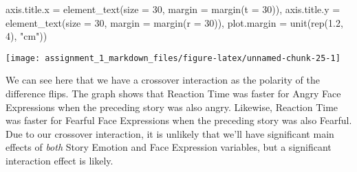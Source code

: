 \documentclass[
]{article}
\newenvironment{Shaded}{\begin{snugshade}}{\end{snugshade}}
\newcommand{\AttributeTok}[1]{\textcolor[rgb]{0.77,0.63,0.00}{#1}}
\newcommand{\DecValTok}[1]{\textcolor[rgb]{0.00,0.00,0.81}{#1}}
\newcommand{\FloatTok}[1]{\textcolor[rgb]{0.00,0.00,0.81}{#1}}
\newcommand{\FunctionTok}[1]{\textcolor[rgb]{0.00,0.00,0.00}{#1}}
\newcommand{\NormalTok}[1]{#1}
\newcommand{\StringTok}[1]{\textcolor[rgb]{0.31,0.60,0.02}{#1}}
\begin{document}
\begin{Shaded}
\begin{Highlighting}[]
        \AttributeTok{axis.title.x =} \FunctionTok{element\_text}\NormalTok{(}\AttributeTok{size =} \DecValTok{30}\NormalTok{, }\AttributeTok{margin =} \FunctionTok{margin}\NormalTok{(}\AttributeTok{t =} \DecValTok{30}\NormalTok{)),}
        \AttributeTok{axis.title.y =} \FunctionTok{element\_text}\NormalTok{(}\AttributeTok{size =} \DecValTok{30}\NormalTok{, }\AttributeTok{margin =} \FunctionTok{margin}\NormalTok{(}\AttributeTok{r =} \DecValTok{30}\NormalTok{)),}
        \AttributeTok{plot.margin =} \FunctionTok{unit}\NormalTok{(}\FunctionTok{rep}\NormalTok{(}\FloatTok{1.2}\NormalTok{, }\DecValTok{4}\NormalTok{), }\StringTok{"cm"}\NormalTok{))}
\end{Highlighting}
\end{Shaded}

\texttt{[image: assignment\_1\_markdown\_files/figure-latex/unnamed-chunk-25-1]}

We can see here that we have a crossover interaction as the polarity of
the difference flips. The graph shows that Reaction Time was faster for
Angry Face Expressions when the preceding story was also angry.
Likewise, Reaction Time was faster for Fearful Face Expressions when the
preceding story was also Fearful. Due to our crossover interaction, it
is unlikely that we'll have significant main effects of \emph{both}
Story Emotion and Face Expression variables, but a significant
interaction effect is likely.
\end{document}
